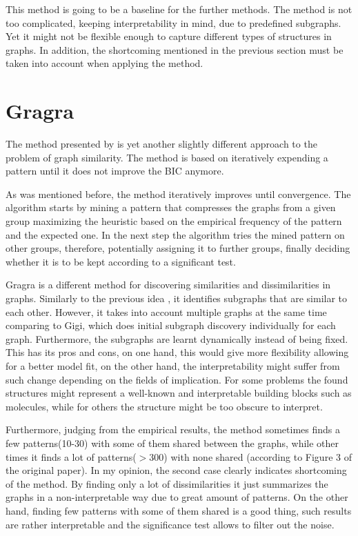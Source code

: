 \documentclass{article}
\begin{document}
This method is going to be a baseline for the further methods. The method is not too complicated, keeping interpretability in mind, due to predefined subgraphs. Yet it might not be flexible enough to capture different types of structures in graphs. In addition, the shortcoming mentioned in the previous section must be taken into account when applying the method.

\section{Gragra}
The method presented by \cite{coupette2022gragra} is yet another slightly different approach to the problem of graph similarity. The method is based on iteratively expending a pattern until it does not improve the BIC anymore. 

As was mentioned before, the method iteratively improves until convergence. The algorithm starts by mining a pattern that compresses the graphs from a given group maximizing the heuristic based on the empirical frequency of the pattern and the expected one. In the next step the algorithm tries the mined pattern on other groups, therefore, potentially assigning it to further groups, finally deciding whether it is to be kept according to a significant test. 

Gragra is a different method for discovering similarities and dissimilarities in graphs. Similarly to the previous idea \citep{coupette2021momo}, it identifies subgraphs that are similar to each other. However, it takes into account multiple graphs at the same time comparing to Gigi, which does initial subgraph discovery individually for each graph. Furthermore, the subgraphs are learnt dynamically instead of being fixed. This has its pros and cons, on one hand, this would give more flexibility allowing for a better model fit, on the other hand, the interpretability might suffer from such change depending on the fields of implication. For some problems the found structures might represent a well-known and interpretable building blocks such as molecules, while for others the structure might be too obscure to interpret. 

Furthermore, judging from the empirical results, the method sometimes finds a few patterns(10-30) with some of them shared between the graphs, while other times it finds a lot of patterns($>$300) with none shared (according to Figure 3 of the original paper). In my opinion, the second case clearly indicates shortcoming of the method. By finding only a lot of dissimilarities it just summarizes the graphs in a non-interpretable way due to great amount of patterns. On the other hand, finding few patterns with some of them shared is a good thing, such results are rather interpretable and the significance test allows to filter out the noise.
\end{document}
